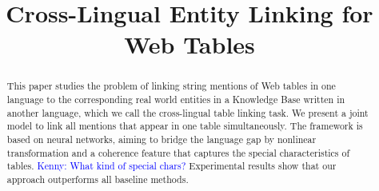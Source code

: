 \documentclass[11pt,letterpaper]{article}
\newcommand{\KZ}[1]{\textcolor{blue}{Kenny: #1}}
\begin{document}
%

\title{Cross-Lingual Entity Linking for Web Tables}

\author{
}
\maketitle
\begin{abstract}

This paper studies the problem of linking string mentions of Web tables in 
one language to the corresponding real world entities in 
a Knowledge Base written in another language, which 
we call the cross-lingual table linking task. We present a joint model to 
link all mentions that appear in one table simultaneously. The framework 
is based on neural networks, aiming to bridge the language gap by 
nonlinear transformation and a coherence feature that captures 
the special characteristics of tables. \KZ{What kind of special chars?} 
Experimental results show that our approach outperforms 
all baseline methods.
\end{abstract}















\end{document}
